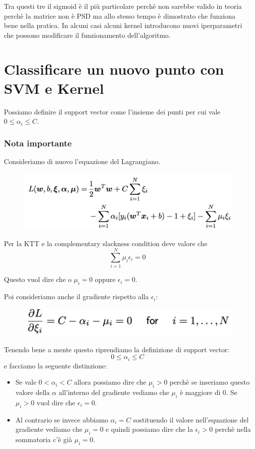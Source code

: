 \documentclass[14pt]{extreport}
\begin{document}
Tra questi tre il sigmoid è il più particolare perchè non sarebbe valido in teoria perchè la matrice non è PSD ma allo stesso tempo è dimostrato che
funziona bene nella pratica. In alcuni casi alcuni kernel introducono nuovi iperparametri che possono modificare il funzionamento dell'algoritmo.

\section{Classificare un nuovo punto con SVM e Kernel}

Possiamo definire il support vector come l'insieme dei punti per cui vale $0 \leq \alpha_i \leq C$. 

\subsubsection{Nota importante}

Consideriamo di nuovo l'equazione del Lagrangiano.
\begin{figure}[H]
\centering
\includegraphics[width=0.7\linewidth]{350.jpeg}
\end{figure}

Per la KTT e la complementary slackness condition deve valore che $$\sum_{i=1}^N \mu_i \epsilon_i = 0$$

Questo vuol dire che o $\mu_i = 0$ oppure $\epsilon_i=0$.

Poi consideriamo anche il gradiente rispetto alla $\epsilon_i$:

\begin{figure}[H]
\centering
\includegraphics[width=0.7\linewidth]{351.jpeg}
\end{figure}

Tenendo bene a mente questo riprendiamo la definizione di support vector: $$0 \leq \alpha_i \leq C$$ e facciamo la seguente distinzione:
\begin{itemize}
\item Se vale $0 < \alpha_i < C$ allora possiamo dire che $\mu_i > 0$ perchè se inseriamo questo valore della $\alpha$ all'interno del gradiente
vediamo che $\mu_i$ è maggiore di 0. Se $\mu_i > 0$ vuol dire che $\epsilon_i = 0$.
\item Al contrario se invece abbiamo $\alpha_i = C$ sostituendo il valore nell'equazione del gradiente vediamo che $\mu_i = 0$ e quindi possiamo dire
che la $\epsilon_i > 0$ perchè nella sommatoria c'è già $\mu_i = 0$.
\end{itemize}
\end{document}

